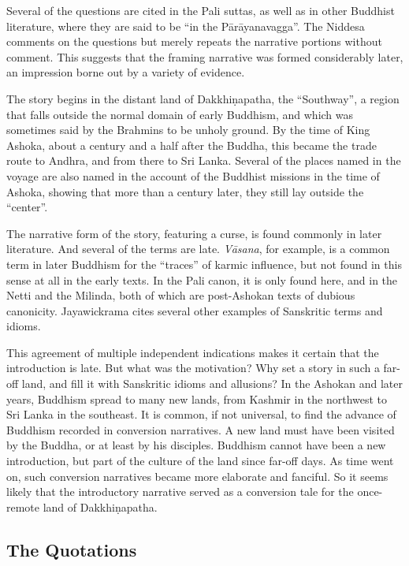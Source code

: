 \documentclass[12pt,openany]{book}%
\begin{document}
Several of the questions are cited in the Pali suttas, as well as in other Buddhist literature, where they are said to be “in the \textsanskrit{Pārāyanavagga}”. The Niddesa comments on the questions but merely repeats the narrative portions without comment. This suggests that the framing narrative was formed considerably later, an impression borne out by a variety of evidence.

The story begins in the distant land of \textsanskrit{Dakkhiṇapatha}, the “Southway”, a region that falls outside the normal domain of early Buddhism, and which was sometimes said by the Brahmins to be unholy ground. By the time of King Ashoka, about a century and a half after the Buddha, this became the trade route to Andhra, and from there to Sri Lanka. Several of the places named in the voyage are also named in the account of the Buddhist missions in the time of Ashoka, showing that more than a century later, they still lay outside the “center”.

The narrative form of the story, featuring a curse, is found commonly in later literature. And several of the terms are late. \textit{\textsanskrit{Vāsana}}, for example, is a common term in later Buddhism for the “traces” of karmic influence, but not found in this sense at all in the early texts. In the Pali canon, it is only found here, and in the Netti and the Milinda, both of which are post-Ashokan texts of dubious canonicity. Jayawickrama cites several other examples of Sanskritic terms and idioms.

This agreement of multiple independent indications makes it certain that the introduction is late. But what was the motivation? Why set a story in such a far-off land, and fill it with Sanskritic idioms and allusions? In the Ashokan and later years, Buddhism spread to many new lands, from Kashmir in the northwest to Sri Lanka in the southeast. It is common, if not universal, to find the advance of Buddhism recorded in conversion narratives. A new land must have been visited by the Buddha, or at least by his disciples. Buddhism cannot have been a new introduction, but part of the culture of the land since far-off days. As time went on, such conversion narratives became more elaborate and fanciful. So it seems likely that the introductory narrative served as a conversion tale for the once-remote land of \textsanskrit{Dakkhiṇapatha}.

\subsection*{The Quotations}
\end{document}
